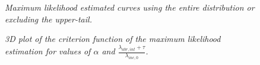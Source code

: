 \documentclass[letterpaper,12pt]{article}
\theoremstyle{definition}
\begin{document}
\begin{figure}[htb]\centering \captionsetup{width=5.8in}
    \caption{\label{fig:MLE_extail}\textit{Maximum likelihood estimated curves using the entire distribution or excluding the upper-tail.}}
\end{figure}

\begin{figure}[htb]\centering \captionsetup{width=5.8in}
    \caption{\label{fig:Crit}\textit{3D plot of the criterion function of the maximum likelihood estimation for values of $\alpha$ and $\frac{\lambda_{abr, int} + \tau}{\lambda_{inc,0}}$.}}
\end{figure}
\end{document}
